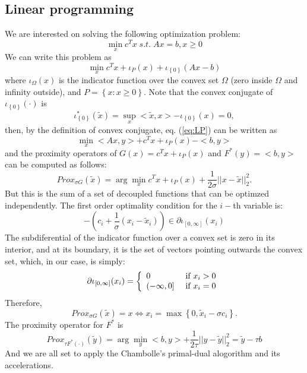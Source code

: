 \documentclass[12pt,draftcls, onecolumn, letterpaper,compsoc]{IEEEtran}
\begin{document}
\subsection{Linear programming}
We are interested on solving the following optimization problem:
\begin{equation}
	\min_{x} c^{T}x \;s.t.\; Ax=b, x\geq0
\end{equation}
We can write this problem as
\begin{equation}\label{eq:LP}
	\min_{x} c^{T}x + \iota_{P}(x) + \iota_{\left\lbrace0\right\rbrace}(Ax-b)
\end{equation}
where $\iota_{\Omega}(x)$ is the indicator function over the convex set $\Omega$ (zero inside $\Omega$ and infinity outside), and $P=\left\lbrace x: x\geq0\right\rbrace$. Note that the convex conjugate of $\iota_{\left\lbrace 0\right\rbrace}(\cdot)$ is
\begin{equation}
	\iota_{\left\lbrace 0\right\rbrace}^{*}(\tilde{x}) = \sup_{x} <\tilde{x},x > -\iota_{\left\lbrace 0\right\rbrace}(x) = 0,
\end{equation}
then, by the definition of convex conjugate, eq. (\ref{eq:LP}) can be written as
\begin{equation}\label{eq:LP}
	\min_{x} <Ax, y> + c^{T}x + \iota_{P}(x) - <b,y>
\end{equation}
and the proximity operators of $G(x) = c^{T}x + \iota_{P}(x)$ and $F^{*}(y)=<b,y>$ can be computed as follows:
\begin{equation}\label{eq:LP}
	Prox_{\sigma G}(\tilde{x}) = \arg\min_{x} c^{T}x + \iota_{P}(x) + \frac{1}{2\sigma}||x-\tilde{x}||_{2}^{2}.
\end{equation}
But this is the sum of a set of decoupled functions that can be optimzed independently. The first order optimality condition for the $i-$th variable is:
\begin{equation}
	-\left(c_{i} + \frac{1}{\sigma}(x_{i}-\tilde{x}_{i})\right)\in \partial \iota_{[0,\infty]}(x_{i})
\end{equation}
The subdiferential of the indicator function over a convex set is zero in its interior, and at its boundary, it is the set of vectors pointing outwards the convex set, which, in our case, is simply:
\begin{equation}
	\partial \iota_{[0,\infty]}(x_{i}) = \left\lbrace
	\begin{array}{ll}
		0 & $ if $ x_i> 0\\
		(-\infty, 0] & $ if $ x_{i}=0
	\end{array}
	\right.
\end{equation}
Therefore,
\begin{equation}\label{eq:LP}
	Prox_{\sigma G}(\tilde{x}) = x \Leftrightarrow x_{i} = \max\left\lbrace0, \tilde{x}_i - \sigma c_{i}\right\rbrace.
\end{equation}
The proximity operator for $F^{*}$ is
\begin{equation}
	Prox_{\tau F^{*}(\cdot)}(\tilde{y})=\arg\min_{y} <b,y> + \frac{1}{2\tau}||y-\tilde{y}||_{2}^{2} = \tilde{y} - \tau b
\end{equation}
And we are all set to apply the Chambolle's primal-dual alogorithm and its accelerations.
\end{document}
